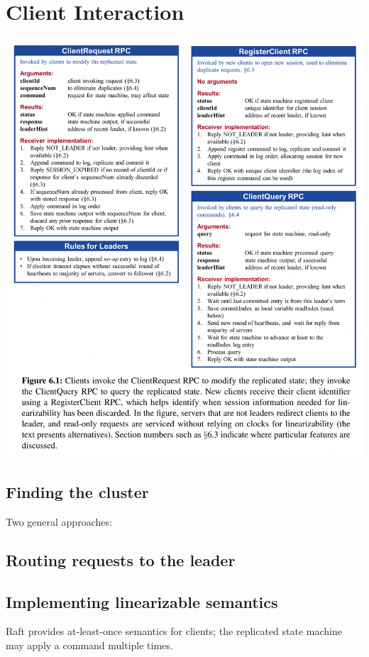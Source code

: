 \documentclass[11pt]{article}
\begin{document}
\section{Client Interaction}
\label{sec:orgf8c2dcc}
\begin{center}
\includegraphics[width=.99\textwidth]{../../images/papers/21.png}
\label{}
\end{center}
\subsection{Finding the cluster}
\label{sec:orgf3a73a9}
Two general approaches:
\subsection{Routing requests to the leader}
\label{sec:org7270ebc}
\subsection{Implementing linearizable semantics}
\label{sec:org206ec42}
Raft provides at-least-once semantics for clients; the replicated state machine may apply a command
multiple times.
\end{document}
